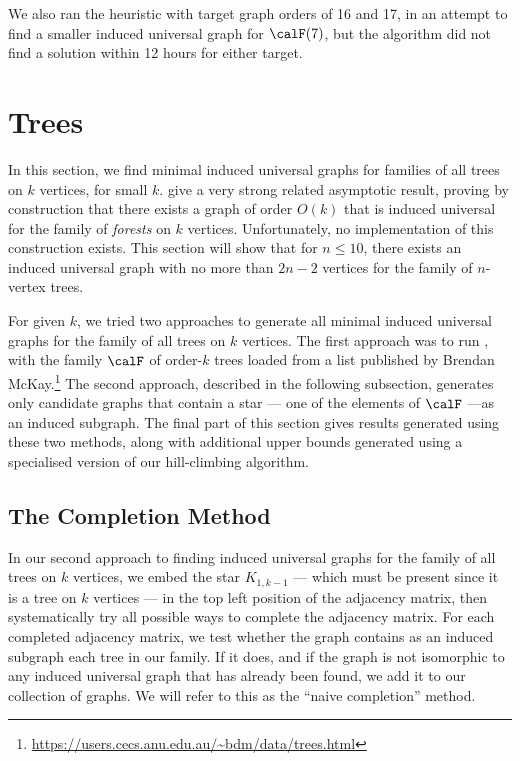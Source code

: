 We also ran the heuristic with target graph orders of 16 and 17, in an
attempt to find a smaller induced universal graph for $\calF(7)$, but the algorithm
did not find a solution within 12 hours for either target.

\section{Trees}\label{sec:trees}

In this section, we find minimal induced universal graphs for families
of all trees on $k$ vertices, for small $k$.
\citet{DBLP:journals/jacm/AlstrupDK17}
give a very strong related asymptotic result, proving by construction that
there exists a graph of order $O(k)$ that is induced universal for the family of
\emph{forests} on $k$ vertices.  Unfortunately, no implementation of this
construction exists.  This section will show that for $n \leq 10$, there
exists an induced universal graph with no more than $2n - 2$ vertices
for the family of $n$-vertex trees.

For given $k$, we tried two approaches to generate all minimal induced
universal graphs for the family of
all trees on $k$ vertices.
The first approach was to run , with the family
$\calF$ of order-$k$ trees loaded from
a list published by Brendan
McKay.\footnote{\url{https://users.cecs.anu.edu.au/~bdm/data/trees.html}}
The second approach, described in the following subsection, generates
only candidate graphs that contain a star --- one of the elements
of $\calF$ ---as an induced subgraph.  The final part of this section
gives results generated using these two methods, along with additional
upper bounds generated using a specialised version of our hill-climbing
algorithm.

\subsection{The Completion Method}

In our second approach to finding induced universal graphs for the
family of all trees on $k$ vertices, we embed the star $K_{1,k-1}$ --- which must be
present since it is a tree on $k$ vertices --- in the top left position
of the adjacency matrix, then systematically try all possible ways to complete
the adjacency matrix.  For each completed adjacency matrix, we test whether
the graph contains as an induced subgraph each tree in our family.
If it does, and if the graph is not isomorphic to any induced universal
graph that has already been found, we add it to our collection of graphs.
We will refer to this as the ``naive completion'' method.


